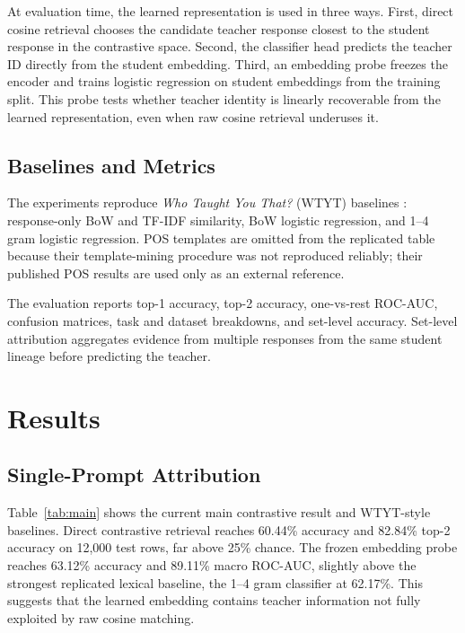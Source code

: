 \documentclass[11pt]{article}
\begin{document}
At evaluation time, the learned representation is used in three ways.
First, direct cosine retrieval chooses the candidate teacher response closest to the student response in the contrastive space.
Second, the classifier head predicts the teacher ID directly from the student embedding.
Third, an embedding probe freezes the encoder and trains logistic regression on student embeddings from the training split.
This probe tests whether teacher identity is linearly recoverable from the learned representation, even when raw cosine retrieval underuses it.

\subsection{Baselines and Metrics}

The experiments reproduce \textit{Who Taught You That?} (WTYT) baselines \citep{wadhwa-etal-2025-taught}: response-only BoW and TF-IDF similarity, BoW logistic regression, and 1--4 gram logistic regression.
POS templates are omitted from the replicated table because their template-mining procedure was not reproduced reliably; their published POS results are used only as an external reference.

The evaluation reports top-1 accuracy, top-2 accuracy, one-vs-rest ROC-AUC, confusion matrices, task and dataset breakdowns, and set-level accuracy.
Set-level attribution aggregates evidence from multiple responses from the same student lineage before predicting the teacher.

\section{Results}

\subsection{Single-Prompt Attribution}

Table~\ref{tab:main} shows the current main contrastive result and WTYT-style baselines.
Direct contrastive retrieval reaches 60.44\% accuracy and 82.84\% top-2 accuracy on 12,000 test rows, far above 25\% chance.
The frozen embedding probe reaches 63.12\% accuracy and 89.11\% macro ROC-AUC, slightly above the strongest replicated lexical baseline, the 1--4 gram classifier at 62.17\%.
This suggests that the learned embedding contains teacher information not fully exploited by raw cosine matching.
\end{document}

